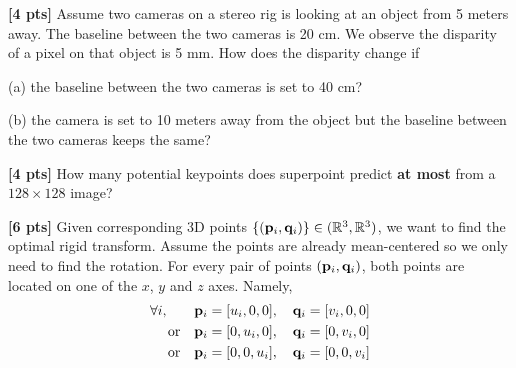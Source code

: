 \begin{questions}
    \begin{tcolorbox}[fit,height=5cm, width=\textwidth, blank, borderline={0.5pt}{-2pt},halign=left, valign=center, nobeforeafter]


    \end{tcolorbox}

    \question \textbf{[4 pts]} Assume two cameras on a stereo rig is looking at an object from 5 meters away. The baseline between the two cameras is 20 cm. We observe the disparity of a pixel on that object is 5 mm. How does the disparity change if

    (a) the baseline between the two cameras is set to 40 cm?

    \begin{tcolorbox}[fit,height=5cm, width=\textwidth, blank, borderline={0.5pt}{-2pt},halign=left, valign=center, nobeforeafter]


    \end{tcolorbox}

    (b) the camera is set to 10 meters away from the object but the baseline between the two cameras keeps the same?

    \begin{tcolorbox}[fit,height=5cm, width=\textwidth, blank, borderline={0.5pt}{-2pt},halign=left, valign=center, nobeforeafter]


    \end{tcolorbox}


    \question \textbf{[4 pts]} How many potential keypoints does superpoint predict \textbf{at most} from a $128\times128$ image?

    \begin{tcolorbox}[fit,height=5cm, width=\textwidth, blank, borderline={0.5pt}{-2pt},halign=left, valign=center, nobeforeafter]


    \end{tcolorbox}

    \question \textbf{[6 pts]} Given corresponding 3D points $\{(\mathbf{p}_i, \mathbf{q}_i)\} \in (\mathbb{R}^3, \mathbb{R}^3)$, we want to find the optimal rigid transform. Assume the points are already mean-centered so we only need to find the rotation. For every pair of points $(\mathbf{p}_i, \mathbf{q}_i)$, both points are located on one of the $x$, $y$ and $z$ axes. Namely,
    \begin{align*}
        \forall i, \qquad & \mathbf{p}_i = [u_i, 0, 0], \quad \mathbf{q}_i = [v_i, 0, 0] \\
        \text{or} \quad   & \mathbf{p}_i = [0, u_i, 0], \quad \mathbf{q}_i = [0, v_i, 0] \\
        \text{or} \quad   & \mathbf{p}_i = [0, 0, u_i], \quad \mathbf{q}_i = [0, 0, v_i] \\
    \end{align*}


\end{questions}
